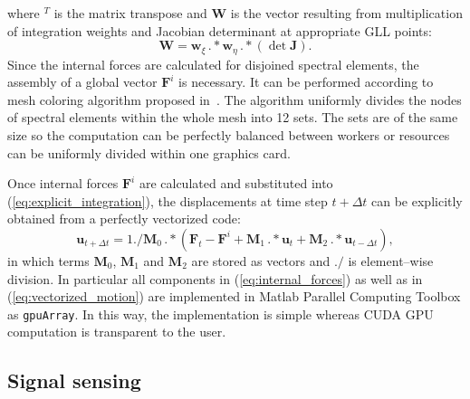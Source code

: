 \documentclass[12pt]{iopart}
\renewcommand{\vec}[1]{\mathbf{#1}}
\begin{document}
where \(^T\) is the matrix transpose and \(\vec{W}\) is the vector resulting from multiplication of integration weights and Jacobian determinant at appropriate GLL points:
\begin{equation}
\vec{W} = \vec{w}_{\xi}\,.*\vec{w}_{\eta}\,.*\left(\det\vec{J}\right).
\end{equation}
Since the internal forces are calculated for disjoined spectral elements, the assembly of a global vector \(\vec{F}^i\) is necessary. It can be performed according to mesh coloring algorithm proposed in~\cite{Kudela2016}. The algorithm uniformly divides the nodes of spectral elements within the whole mesh into 12 sets. The sets are of the same size so the computation can be perfectly balanced between workers or resources can be uniformly divided within one graphics card.

Once internal forces \(\vec{F}^i\) are calculated and substituted into (\ref{eq:explicit_integration}), the displacements at time step \(t+\Delta t\) can be explicitly obtained from a perfectly vectorized code:
\begin{equation}
\vec{u}_{t+\Delta t}=1./\vec{M}_0\, .*\left(\vec{F}_t - \vec{F}^i +\vec{M}_1 \, .* \vec{u}_t +\vec{M}_2 \, .* \vec{u}_{t-\Delta t}\right),
\label{eq:vectorized_motion}
\end{equation} 
in which terms \(\vec{M}_0\), \(\vec{M}_1\) and \(\vec{M}_2\) are stored as vectors and \(./\) is element--wise division. In particular all components in (\ref{eq:internal_forces}) as well as in (\ref{eq:vectorized_motion}) are implemented in Matlab Parallel Computing Toolbox as \verb|gpuArray|. In this way, the implementation is simple whereas CUDA GPU computation is transparent to the user. 

\subsection{Signal sensing}
\end{document}
